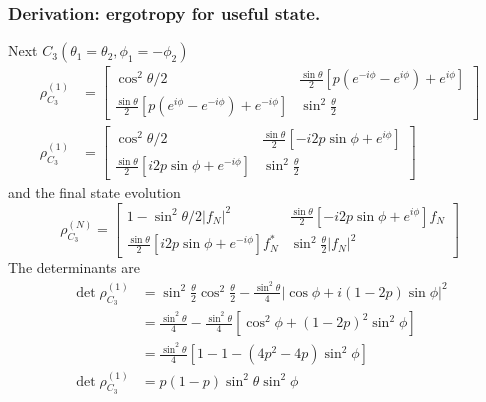 \documentclass[../../../main.tex]{subfiles}
\begin{document}
\subsubsection{Derivation: ergotropy for useful state.}
Next $C_3(\theta_1=\theta_2,\phi_1=-\phi_2)$
\begin{align*}
  \rho^{(1)}_{C_3}  & =
  \begin{bmatrix}
    \cos ^2 \theta/2                                                               & \frac{\sin \theta  }{2} \left[p(e^{-i\phi}-e^{i\phi}) + e^{i\phi}  \right] \\
    \frac{\sin \theta  }{2} \left[p(e^{i\phi} - e^{-i\phi} ) + e^{-i\phi}  \right] & \sin ^2 \frac{\theta  }{2}
  \end{bmatrix} \\
  \rho ^{(1)}_{C_3} & =
  \begin{bmatrix}
    \cos ^2 \theta/2                                                 & \frac{\sin \theta}{2} \left[-i2p \sin \phi + e^{i\phi}  \right] \\
    \frac{\sin \theta  }{2} \left[i2p \sin\phi + e^{-i\phi}  \right] & \sin ^2 \frac{\theta  }{2}
  \end{bmatrix}
\end{align*}
and the final state evolution
\begin{equation*}
  \rho ^{(N)}_{C_3}  =
  \begin{bmatrix}
    1- \sin^2 \theta/2 |f_N|^2                                             & \frac{\sin \theta}{2} \left[-i2p \sin \phi + e^{i\phi}  \right]f_N \\
    \frac{\sin \theta  }{2} \left[i2p \sin\phi + e^{-i\phi}  \right]f_N ^* & \sin ^2 \frac{\theta  }{2}|f_N|^2
  \end{bmatrix}
\end{equation*}
The determinants are
\begin{align*}
  \det\rho^{(1)}_{C_3}
                         & =
  \sin^2\frac{\theta}{2}\cos^2\frac{\theta}{2}
  -
  \frac{\sin^2\theta}{4}
  \left| \cos \phi+ i(1-2p) \sin \phi\right|^2 \\
                         & =
  \frac{\sin^2\theta}{4}
  -\frac{\sin^2\theta}{4}
  \left[
    \cos^2\phi
    +(1-2p)^2\sin^2 \phi
  \right]                                      \\
                         & =
  \frac{\sin^2\theta}{4}
  \left[
    1-1-
    (4p^2-4p)\sin^2\phi
  \right]                                      \\
  \det \rho ^{(1)}_{C_3} & =
  p(1-p)\sin ^2\theta \sin^2 \phi
\end{align*}
\end{document}
